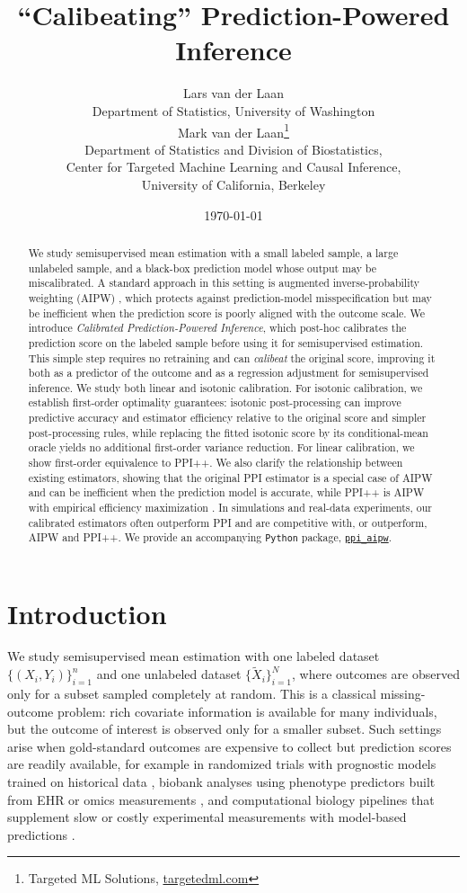 \documentclass{article}
\title{``Calibeating'' Prediction-Powered Inference}
\author{
Lars van der Laan\\
Department of Statistics, University of Washington\\[0.75em]
Mark van der Laan\thanks{Targeted ML Solutions, \href{https://www.targetedml.com/}{targetedml.com}}\\
Department of Statistics and Division of Biostatistics,\\
Center for Targeted Machine Learning and Causal Inference,\\
University of California, Berkeley
}
\date{\today}
\theoremstyle{plain}
\theoremstyle{definition}
\newcommand{\1}{\mathbbm{1}}
\begin{document}
\maketitle

\begin{abstract}
We study semisupervised mean estimation with a small labeled sample, a large unlabeled sample, and a black-box prediction model whose output may be miscalibrated. A standard approach in this setting is augmented inverse-probability weighting (AIPW) \citep{robins1994estimation}, which protects against prediction-model misspecification but may be inefficient when the prediction score is poorly aligned with the outcome scale. We introduce \emph{Calibrated Prediction-Powered Inference}, which post-hoc calibrates the prediction score on the labeled sample before using it for semisupervised estimation. This simple step requires no retraining and can \emph{calibeat} the original score, improving it both as a predictor of the outcome and as a regression adjustment for semisupervised inference. We study both linear and isotonic calibration. For isotonic calibration, we establish first-order optimality guarantees: isotonic post-processing can improve predictive accuracy and estimator efficiency relative to the original score and simpler post-processing rules, while replacing the fitted isotonic score by its conditional-mean oracle yields no additional first-order variance reduction. For linear calibration, we show first-order equivalence to PPI++. We also clarify the relationship between existing estimators, showing that the original PPI estimator is a special case of AIPW and can be inefficient when the prediction model is accurate, while PPI++ is AIPW with empirical efficiency maximization \citep{rubin2008empirical}. In simulations and real-data experiments, our calibrated estimators often outperform PPI and are competitive with, or outperform, AIPW and PPI++. We provide an accompanying \texttt{Python} package, \href{https://larsvanderlaan.github.io/ppi-aipw/}{\texttt{ppi\_aipw}}.
\end{abstract}

\section{Introduction}

We study semisupervised mean estimation with one labeled dataset \(\{(X_i, Y_i)\}_{i=1}^n\) and one unlabeled dataset \(\{\widetilde X_i\}_{i=1}^N\), where outcomes are observed only for a subset sampled completely at random. This is a classical missing-outcome problem: rich covariate information is available for many individuals, but the outcome of interest is observed only for a smaller subset. Such settings arise when gold-standard outcomes are expensive to collect but prediction scores are readily available, for example in randomized trials with prognostic models trained on historical data \citep{schuler2022increasing}, biobank analyses using phenotype predictors built from EHR or omics measurements \citep{hong2019semisupervised,zhang2019phecap}, and computational biology pipelines that supplement slow or costly experimental measurements with model-based predictions \citep{ppi2023,crossppi2024}.
\end{document}
